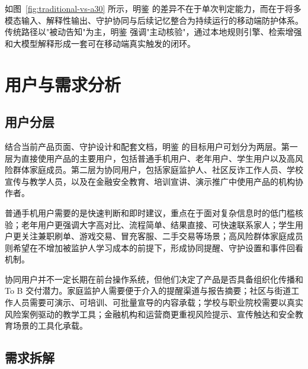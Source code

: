 \documentclass[UTF8,a4paper,12pt]{ctexart}
\begin{document}
如图~\ref{fig:traditional-vs-a30} 所示，明鉴 的差异不在于单次判定能力，而在于将多模态输入、解释性输出、守护协同与后续记忆整合为持续运行的移动端防护体系。传统路径以"被动告知"为主，明鉴 强调"主动核验"，通过本地规则引擎、检索增强和大模型解释形成一套可在移动端真实触发的闭环。

\section{用户与需求分析}

\subsection{用户分层}

结合当前产品页面、守护设计和配套文档，明鉴 的目标用户可划分为两层。第一层为直接使用产品的主要用户，包括普通手机用户、老年用户、学生用户以及高风险群体家庭成员。第二层为协同用户，包括家庭监护人、社区反诈工作人员、学校宣传与教学人员，以及在金融安全教育、培训宣讲、演示推广中使用产品的机构协作者。

普通手机用户需要的是快速判断和即时建议，重点在于面对复杂信息时的低门槛核验；老年用户更强调大字高对比、流程简单、结果直接、可快速联系家人；学生用户更关注兼职刷单、游戏交易、冒充客服、二手交易等场景；高风险群体家庭成员则希望在不增加被监护人学习成本的前提下，形成协同提醒、守护设置和事件回看机制。

协同用户并不一定长期在前台操作系统，但他们决定了产品是否具备组织化传播和 To B 交付潜力。家庭监护人需要便于介入的提醒渠道与报告摘要；社区与街道工作人员需要可演示、可培训、可批量宣导的内容承载；学校与职业院校需要以真实风险案例驱动的教学工具；金融机构和运营商更重视风险提示、宣传触达和安全教育场景的工具化承载。

\subsection{需求拆解}
\end{document}
